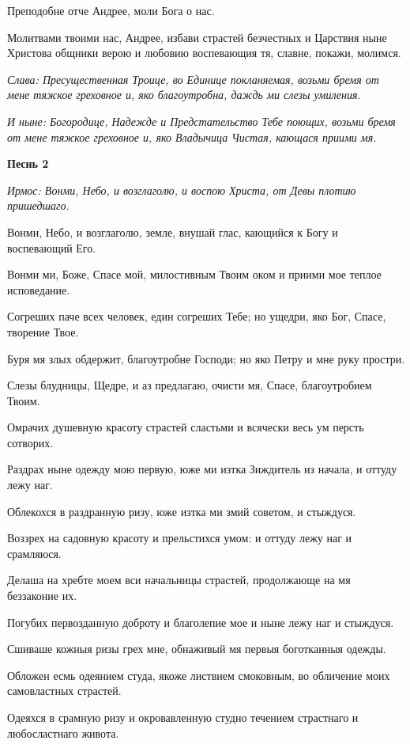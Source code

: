 Преподобне отче Андрее, моли Бога о нас.


Молитвами твоими нас, Андрее, избави страстей безчестных и Царствия ныне Христова общники верою и любовию воспевающия тя, славне, покажи, молимся.


\itshape Слава\normalfont{}: Пресущественная Троице, во Единице покланяемая, возьми бремя от мене тяжкое греховное и, яко благоутробна, даждь ми слезы умиления.


\itshape И ныне\normalfont{}: Богородице, Надежде и Предстательство Тебе поющих, возьми бремя от мене тяжкое греховное и, яко Владычица Чистая, кающася приими мя. 


\medskip
\bfseries Песнь 2\normalfont{}


\itshape Ирмос\normalfont{}: Вонми, Небо, и возглаголю, и воспою Христа, от Девы плотию пришедшаго.


Вонми, Небо, и возглаголю, земле, внушай глас, кающийся к Богу и воспевающий Его.


Вонми ми, Боже, Спасе мой, милостивным Твоим оком и приими мое теплое исповедание.


Согреших паче всех человек, един согреших Тебе; но ущедри, яко Бог, Спасе, творение Твое.


Буря мя злых обдержит, благоутробне Господи; но яко Петру и мне руку простри.


Слезы блудницы, Щедре, и аз предлагаю, очисти мя, Спасе, благоутробием Твоим.


Омрачих душевную красоту страстей сластьми и всячески весь ум персть сотворих.


Раздрах ныне одежду мою первую, юже ми изтка Зиждитель из начала, и оттуду лежу наг.


Облекохся в раздранную ризу, юже изтка ми змий советом, и стыждуся.


Воззрех на садовную красоту и прельстихся умом: и оттуду лежу наг и срамляюся.


Делаша на хребте моем вси начальницы страстей, продолжающе на мя беззаконие их.


Погубих первозданную доброту и благолепие мое и ныне лежу наг и стыждуся.


Сшиваше кожныя ризы грех мне, обнаживый мя первыя боготканныя одежды.


Обложен есмь одеянием студа, якоже листвием смоковным, во обличение моих самовластных страстей.


Одеяхся в срамную ризу и окровавленную студно течением страстнаго и любосластнаго живота.


